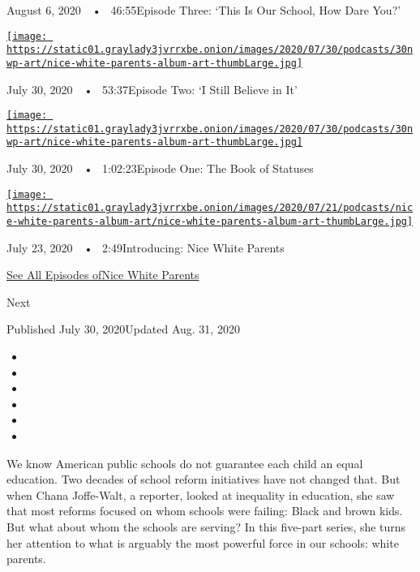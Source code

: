 August 6, 2020~~•~ 46:55Episode Three: `This Is Our School, How Dare
You?'

\href{https://www.nytimes3xbfgragh.onion/2020/07/30/podcasts/nice-white-parents-serial-2.html?action=click\&module=audio-series-bar\&region=header\&pgtype=Article}{\texttt{[image: https://static01.graylady3jvrrxbe.onion/images/2020/07/30/podcasts/30nwp-art/nice-white-parents-album-art-thumbLarge.jpg]}}

July 30, 2020~~•~ 53:37Episode Two: `I Still Believe in It'

\href{https://www.nytimes3xbfgragh.onion/2020/07/30/podcasts/nice-white-parents-serial.html?action=click\&module=audio-series-bar\&region=header\&pgtype=Article}{\texttt{[image: https://static01.graylady3jvrrxbe.onion/images/2020/07/30/podcasts/30nwp-art/nice-white-parents-album-art-thumbLarge.jpg]}}

July 30, 2020~~•~ 1:02:23Episode One: The Book of Statuses

\href{https://www.nytimes3xbfgragh.onion/2020/07/23/podcasts/nice-white-parents-serial.html?action=click\&module=audio-series-bar\&region=header\&pgtype=Article}{\texttt{[image: https://static01.graylady3jvrrxbe.onion/images/2020/07/21/podcasts/nice-white-parents-album-art/nice-white-parents-album-art-thumbLarge.jpg]}}

July 23, 2020~~•~ 2:49Introducing: Nice White Parents

\href{https://www.nytimes3xbfgragh.onion/column/nice-white-parents}{See
All Episodes ofNice White Parents}

Next

Published July 30, 2020Updated Aug. 31, 2020

\begin{itemize}
\item
\item
\item
\item
\item
\item
\end{itemize}

We know American public schools do not guarantee each child an equal
education. Two decades of school reform initiatives have not changed
that. But when Chana Joffe-Walt, a reporter, looked at inequality in
education, she saw that most reforms focused on whom schools were
failing: Black and brown kids. But what about whom the schools are
serving? In this five-part series, she turns her attention to what is
arguably the most powerful force in our schools: white parents.

